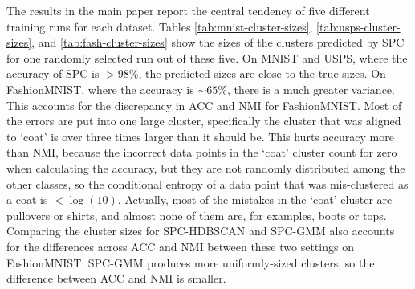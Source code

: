\documentclass[runningheads]{llncs}
\begin{document}
The results in the main paper report the central tendency of five different training runs for each dataset. Tables \ref{tab:mnist-cluster-sizes}, \ref{tab:usps-cluster-sizes}, and \ref{tab:fash-cluster-sizes} show the sizes of the clusters predicted by SPC for one randomly selected run out of these five. On MNIST and USPS, where the accuracy of SPC is $>98\%$, the predicted sizes are close to the true sizes. On FashionMNIST, where the accuracy is $\sim 65\%$, there is a much greater variance. This accounts for the discrepancy in ACC and NMI for FashionMNIST. Most of the errors are put into one large cluster, specifically the cluster that was aligned to `coat' is over three times larger than it should be. This hurts accuracy more than NMI, because the incorrect data points in the `coat' cluster count for zero when calculating the accuracy, but they are not randomly distributed among the other classes, so the conditional entropy of a data point that was mis-clustered as a coat is $<\log(10)$. Actually, most of the mistakes in the `coat' cluster are pullovers or shirts, and almost none of them are, for examples, boots or tops. Comparing the cluster sizes for SPC-HDBSCAN and SPC-GMM also accounts for the differences across ACC and NMI between these two settings on FashionMNIST: SPC-GMM produces more uniformly-sized clusters, so the difference between ACC and NMI is smaller.  
\end{document}
